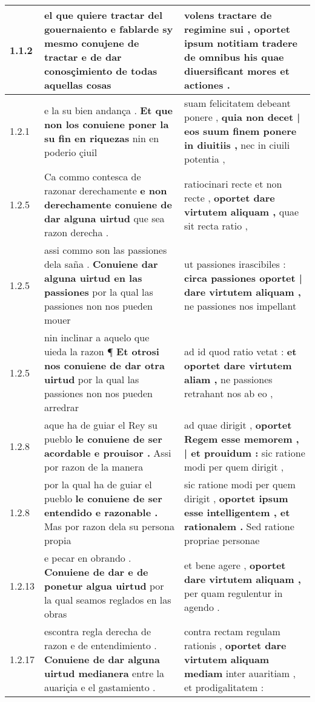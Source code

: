 \begin{tabular}{|p{1cm}|p{6.5cm}|p{6.5cm}|}

\hline
1.1.2 & el que quiere tractar del gouernaiento \textbf{ e fablarde sy mesmo conujene de tractar } e de dar conosçimiento de todas aquellas cosas & volens tractare de regimine sui , \textbf{ oportet ipsum notitiam tradere de omnibus his } quae diuersificant mores et actiones . \\\hline
1.2.1 & e la su bien andança . \textbf{ Et que non los conuiene poner la su fin en riquezas } nin en poderio çiuil & suam felicitatem debeant ponere , \textbf{ quia non decet | eos suum finem ponere in diuitiis , } nec in ciuili potentia , \\\hline
1.2.5 & Ca commo contesca de razonar derechamente \textbf{ e non derechamente conuiene de dar alguna uirtud } que sea razon derecha . & ratiocinari recte et non recte , \textbf{ oportet dare virtutem aliquam , } quae sit recta ratio , \\\hline
1.2.5 & assi commo son las passiones dela saña . \textbf{ Conuiene dar alguna uirtud en las passiones } por la qual las passiones non nos pueden mouer & ut passiones irascibiles : \textbf{ circa passiones oportet | dare virtutem aliquam , } ne passiones nos impellant \\\hline
1.2.5 & nin inclinar a aquelo que uieda la razon ¶ \textbf{ Et otrosi nos conuiene de dar otra uirtud } por la qual las passiones non nos pueden arredrar & ad id quod ratio vetat : \textbf{ et oportet dare virtutem aliam , } ne passiones retrahant nos ab eo , \\\hline
1.2.8 & aque ha de guiar el Rey su pueblo \textbf{ le conuiene de ser acordable e prouisor . } Assi por razon de la manera & ad quae dirigit , \textbf{ oportet Regem esse memorem , | et prouidum : } sic ratione modi per quem dirigit , \\\hline
1.2.8 & por la qual ha de guiar el pueblo \textbf{ le conuiene de ser entendido e razonable . } Mas por razon dela su persona propia & sic ratione modi per quem dirigit , \textbf{ oportet ipsum esse intelligentem , et rationalem . } Sed ratione propriae personae \\\hline
1.2.13 & e pecar en obrando . \textbf{ Conuiene de dar e de ponetur algua uirtud } por la qual seamos reglados en las obras & et bene agere , \textbf{ oportet dare virtutem aliquam , } per quam regulentur in agendo . \\\hline
1.2.17 & escontra regla derecha de razon e de entendimiento . \textbf{ Conuiene de dar alguna uirtud medianera } entre la auariçia e el gastamiento . & contra rectam regulam rationis , \textbf{ oportet dare virtutem aliquam mediam } inter auaritiam , et prodigalitatem : \\\hline

\end{tabular}
